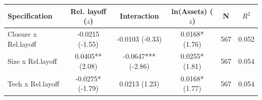 \begin{tabular}{lccccc}
\toprule
Specification & Rel. layoff ($z$) & Interaction & ln(Assets) ($z$) & N & $R^2$ \\
\midrule
Closure x Rel.layoff & -0.0215 (-1.55) & -0.0103 (-0.33) & 0.0168* (1.76) & 567 & 0.052 \\
Size x Rel.layoff & 0.0405** (2.08) & -0.0647*** (-2.86) & 0.0255* (1.81) & 567 & 0.054 \\
Tech x Rel.layoff & -0.0275* (-1.79) & 0.0213 (1.23) & 0.0168* (1.77) & 567 & 0.054 \\
\bottomrule
\end{tabular}